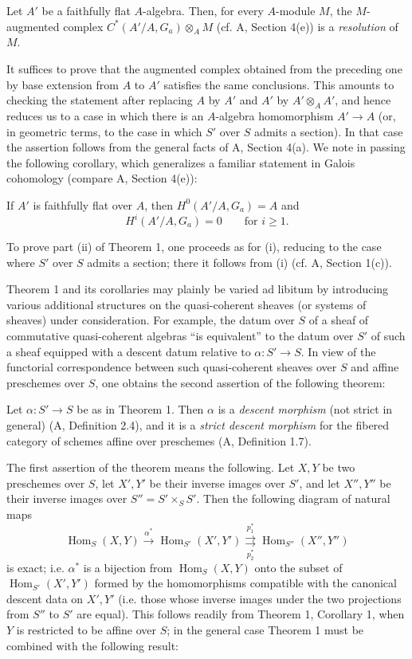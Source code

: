  Let $A'$ be a faithfully flat $A$-algebra. Then, for every
$A$-module $M$, the $M$-augmented complex
$C^*(A'/A,G_a)\otimes_A M$ (cf. A, Section 4(e)) is a \emph{resolution} of
$M$.

It suffices to prove that the augmented complex obtained from the preceding
one by base extension from $A$ to $A'$ satisfies the same conclusions. This
amounts to checking the statement after replacing $A$ by $A'$ and $A'$ by
$A'\otimes_AA'$, and hence reduces us to a case in which there is an
$A$-algebra homomorphism $A'\longrightarrow A$ (or, in geometric terms, to the
case in which $S'$ over $S$ admits a section). In that case the assertion
follows from the general facts of A, Section 4(a). We note in passing the
following corollary, which generalizes a familiar statement in Galois
cohomology (compare A, Section 4(e)):

 If $A'$ is faithfully flat over $A$, then
$H^0(A'/A,G_a)=A$ and
\[
  H^i(A'/A,G_a)=0\qquad\text{for $i\geq1$}.
\]

To prove part (ii) of Theorem 1, one proceeds as for (i), reducing to the case
where $S'$ over $S$ admits a section; there it follows from (i)
(cf. A, Section 1(c)).

Theorem 1 and its corollaries may plainly be varied ad libitum by introducing
various additional structures on the quasi-coherent sheaves (or systems of
sheaves) under consideration. For example, the datum over $S$ of a sheaf
of commutative quasi-coherent algebras “is equivalent” to the datum over $S'$
of such a sheaf equipped with a descent datum relative to
$\alpha:S'\longrightarrow S$. In view of the functorial correspondence
between such quasi-coherent sheaves over $S$ and affine preschemes over $S$,
one obtains the second assertion of the following theorem:

 Let $\alpha:S'\longrightarrow S$ be as in Theorem 1. Then
$\alpha$ is a \emph{descent morphism} (not strict in general)
(A, Definition 2.4), and it is a \emph{strict descent morphism} for the fibered
category of schemes affine over preschemes (A, Definition 1.7).

The first assertion of the theorem means the following. Let $X,Y$ be two
preschemes over $S$, let $X',Y'$ be their inverse images over $S'$, and let
$X'',Y''$ be their inverse images over $S''=S'\times_SS'$. Then the following
diagram of natural maps
\[
  \operatorname{Hom}_S(X,Y)\xrightarrow{\alpha^*}
  \operatorname{Hom}_{S'}(X',Y')
  \underset{p_2^*}{\overset{p_1^*}{\rightrightarrows}}
  \operatorname{Hom}_{S''}(X'',Y'')
\]
is exact; i.e. $\alpha^*$ is a bijection from
$\operatorname{Hom}_S(X,Y)$ onto the subset of
$\operatorname{Hom}_{S'}(X',Y')$ formed by the homomorphisms compatible with
the canonical descent data on $X',Y'$ (i.e. those whose inverse images under
the two projections from $S''$ to $S'$ are equal). This follows readily from
Theorem 1, Corollary 1, when $Y$ is restricted to be affine over $S$; in the
general case Theorem 1 must be combined with the following result:

